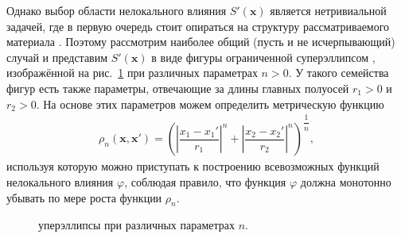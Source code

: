 Однако выбор области нелокального влияния $S'(\boldsymbol{x})$ является нетривиальной задачей, где в первую очередь стоит опираться на структуру рассматриваемого материала \cite{Eringen3}. Поэтому рассмотрим наиболее общий (пусть и не исчерпывающий) случай и представим $S'(\boldsymbol{x})$ в виде фигуры ограниченной суперэллипсом \cite{Superellipse}, изображённой на рис.~\ref{fig:SuperEllipse} при различных параметрах $n > 0$. У такого семейства фигур есть также параметры, отвечающие за длины главных полуосей $r_1 > 0$ и $r_2 > 0$. На основе этих параметров можем определить метрическую функцию
\begin{gather}
	\label{eq:metricFunction}
	\rho_n(\boldsymbol{x}, \boldsymbol{x}') = 
	\left(
		\left| \dfrac{x_1 - x_1'}{r_1} \right|^n +
		\left| \dfrac{x_2 - x_2'}{r_2} \right|^n
	\right)^{\dfrac{1}{n}},
\end{gather}
используя которую можно приступать к построению всевозможных функций нелокального влияния $\varphi$, соблюдая правило, что функция $\varphi$ должна монотонно убывать по мере роста функции $\rho_n$.

\begin{figure}[ht]
    \caption{уперэллипсы при различных параметрах $n$.}\label{fig:SuperEllipse}
\end{figure}

